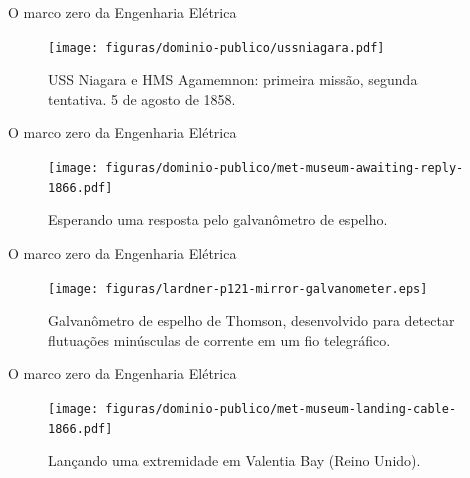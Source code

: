 \documentclass[aspectratio=169]{beamer}
\begin{document}
\begin{frame}{O marco zero da Engenharia Elétrica}
\begin{figure}
	\texttt{[image: figuras/dominio-publico/ussniagara.pdf]}
	\caption{USS Niagara e HMS Agamemnon: primeira missão, segunda tentativa. 5 de agosto de 1858.}
\end{figure}
\end{frame}
\begin{frame}{O marco zero da Engenharia Elétrica}
\begin{figure}
	\texttt{[image: figuras/dominio-publico/met-museum-awaiting-reply-1866.pdf]}
	\caption{Esperando uma resposta pelo galvanômetro de espelho.}
\end{figure}
\end{frame}
\begin{frame}{O marco zero da Engenharia Elétrica}
\begin{figure}[htbp]
	\centering
	\texttt{[image: figuras/lardner-p121-mirror-galvanometer.eps]}
	\caption{Galvanômetro de espelho de Thomson, desenvolvido para detectar flutuações minúsculas de corrente em um fio telegráfico.} 
	\label{fig:701a} 
\end{figure} 
\end{frame}

\begin{frame}{O marco zero da Engenharia Elétrica}
\begin{figure}
	\texttt{[image: figuras/dominio-publico/met-museum-landing-cable-1866.pdf]}
	\caption{Lançando uma extremidade em Valentia Bay (Reino Unido).}
\end{figure}
\end{frame}
%
%
\end{document}
